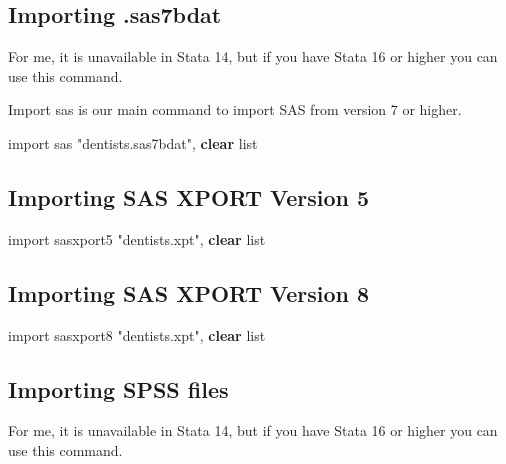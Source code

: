 \documentclass[
]{book}
\newenvironment{Shaded}{\begin{snugshade}}{\end{snugshade}}
\newcommand{\KeywordTok}[1]{\textcolor[rgb]{0.13,0.29,0.53}{\textbf{#1}}}
\newcommand{\NormalTok}[1]{#1}
\newcommand{\OtherTok}[1]{\textcolor[rgb]{0.56,0.35,0.01}{#1}}
\newcommand{\StringTok}[1]{\textcolor[rgb]{0.31,0.60,0.02}{#1}}
\begin{document}
\subsection{Importing .sas7bdat}\label{importing-.sas7bdat}

For me, it is unavailable in Stata 14, but if you have Stata 16 or higher you can use this command.

Import sas is our main command to import SAS from version 7 or higher.

\begin{Shaded}
\begin{Highlighting}[]
\NormalTok{import sas }\StringTok{"dentists.sas7bdat"}\NormalTok{, }\KeywordTok{clear}
\OtherTok{list}
\end{Highlighting}
\end{Shaded}

\subsection{Importing SAS XPORT Version 5}\label{importing-sas-xport-version-5}

\begin{Shaded}
\begin{Highlighting}[]
\NormalTok{import sasxport5 }\StringTok{"dentists.xpt"}\NormalTok{, }\KeywordTok{clear}
\OtherTok{list}
\end{Highlighting}
\end{Shaded}

\subsection{Importing SAS XPORT Version 8}\label{importing-sas-xport-version-8}

\begin{Shaded}
\begin{Highlighting}[]
\NormalTok{import sasxport8 }\StringTok{"dentists.xpt"}\NormalTok{, }\KeywordTok{clear}
\OtherTok{list}
\end{Highlighting}
\end{Shaded}

\subsection{Importing SPSS files}\label{importing-spss-files}

For me, it is unavailable in Stata 14, but if you have Stata 16 or higher
you can use this command.
\end{document}
